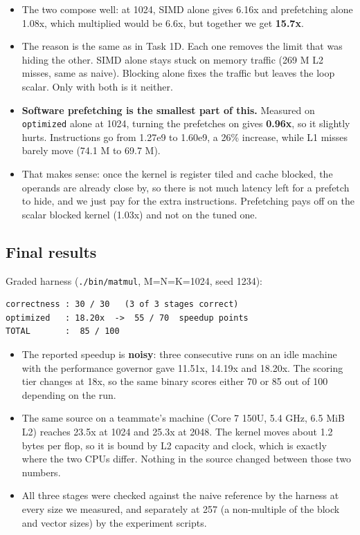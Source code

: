 \documentclass[
  10pt,
]{article}
\begin{document}
\begin{itemize}
\item
  The two compose well: at 1024, SIMD alone gives 6.16x and prefetching alone
  1.08x, which multiplied would be 6.6x, but together we get \textbf{15.7x}.

\item
  The reason is the same as in Task 1D. Each one removes the limit that was
  hiding the other. SIMD alone stays stuck on memory traffic (269 M L2 misses,
  same as naive). Blocking alone fixes the traffic but leaves the loop scalar.
  Only with both is it neither.

\item
  \textbf{Software prefetching is the smallest part of this.} Measured on
  \texttt{optimized} alone at 1024, turning the prefetches on gives
  \textbf{0.96x}, so it slightly hurts. Instructions go from 1.27e9 to 1.60e9,
  a 26\% increase, while L1 misses barely move (74.1 M to 69.7 M).

\item
  That makes sense: once the kernel is register tiled and cache blocked, the
  operands are already close by, so there is not much latency left for a
  prefetch to hide, and we just pay for the extra instructions. Prefetching
  pays off on the scalar blocked kernel (1.03x) and not on the tuned one.
\end{itemize}

\subsection{Final results}\label{final2}

Graded harness (\texttt{./bin/matmul}, M=N=K=1024, seed 1234):

\begin{verbatim}
correctness : 30 / 30   (3 of 3 stages correct)
optimized   : 18.20x  ->  55 / 70  speedup points
TOTAL       :  85 / 100
\end{verbatim}

\begin{itemize}
\item
  The reported speedup is \textbf{noisy}: three consecutive runs on an idle
  machine with the performance governor gave 11.51x, 14.19x and 18.20x. The
  scoring tier changes at 18x, so the same binary scores either 70 or 85 out of
  100 depending on the run.

\item
  The same source on a teammate's machine (Core 7 150U, 5.4 GHz, 6.5 MiB L2)
  reaches 23.5x at 1024 and 25.3x at 2048. The kernel moves about 1.2 bytes per
  flop, so it is bound by L2 capacity and clock, which is exactly where the two
  CPUs differ. Nothing in the source changed between those two numbers.

\item
  All three stages were checked against the naive reference by the harness at
  every size we measured, and separately at 257 (a non-multiple of the block and
  vector sizes) by the experiment scripts.
\end{itemize}
\end{document}

